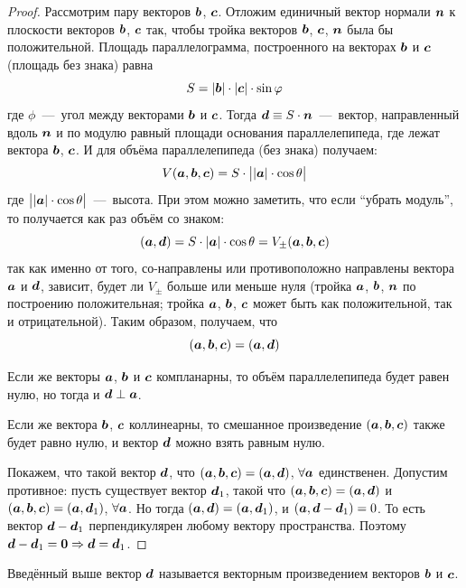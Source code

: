 \documentclass[a4paper,12pt]{article}
\begin{document}
\begin{proof}
    Рассмотрим пару векторов $\boldsymbol b$, $\boldsymbol c$.
    Отложим единичный вектор нормали $\boldsymbol n$ к плоскости векторов $\boldsymbol b$, $\boldsymbol c$ так, чтобы тройка векторов $\boldsymbol b$, $\boldsymbol c$, $\boldsymbol n$ была бы положительной.
    Площадь параллелограмма, построенного на векторах $\boldsymbol b$ и $\boldsymbol c$ (площадь без знака) равна
    \[
      S = |\boldsymbol b| \cdot |\boldsymbol c| \cdot \sin\varphi
    \]
    где $\phi$~---~угол между векторами $\boldsymbol b$ и $\boldsymbol c$.
    Тогда $\bds d \hm\equiv S \hm\cdot \bds n$~---~вектор, направленный вдоль $\boldsymbol n$ и по модулю равный площади основания параллелепипеда, где лежат вектора $\boldsymbol b$, $\boldsymbol c$.
    И для объёма параллелепипеда (без знака) получаем:
    \[
      V(\boldsymbol a, \boldsymbol b, \boldsymbol c) = S \cdot \bigl||\boldsymbol a| \cdot \cos\theta\bigr|
    \]
    где $\bigl||\boldsymbol a| \cdot \cos\theta\bigr|$~---~высота.
    При этом можно заметить, что если ``убрать модуль'', то получается как раз объём со знаком:
    \[
      (\boldsymbol a, \boldsymbol d) = S \cdot |\boldsymbol a| \cdot \cos\theta = V_{\pm}(\boldsymbol a, \boldsymbol b, \boldsymbol c)
    \]
    так как именно от того, со-направлены или противоположно направлены вектора $\boldsymbol a$ и $\boldsymbol d$, зависит, будет ли $V_{\pm}$ больше или меньше нуля (тройка $\boldsymbol a$, $\boldsymbol b$, $\boldsymbol n$ по построению положительная; тройка $\boldsymbol a$, $\boldsymbol b$, $\boldsymbol c$ может быть как положительной, так и отрицательной).
    Таким образом, получаем, что
    \[
      (\boldsymbol a, \boldsymbol b, \boldsymbol c) = (\boldsymbol a, \boldsymbol d)
    \]
    
    Если же векторы $\boldsymbol a$, $\boldsymbol b$ и $\boldsymbol c$ компланарны, то объём параллелепипеда будет равен нулю, но тогда и $\bds d \hm\perp \bds a$.
    
    Если же вектора $\boldsymbol b$, $\boldsymbol c$ коллинеарны, то смешанное произведение $(\boldsymbol a, \boldsymbol b, \boldsymbol c)$ также будет равно нулю, и вектор $\boldsymbol d$ можно взять равным нулю.
    
    Покажем, что такой вектор $\boldsymbol d$, что $(\bds a, \bds b, \bds c) \hm= (\bds a, \bds d)$, $\forall \boldsymbol a$ единственен.
    Допустим противное: пусть существует вектор $\boldsymbol d_1$, такой что $(\bds a, \bds b, \bds c) \hm= (\bds a, \bds d)$ и $(\bds a, \bds b, \bds c) \hm= (\bds a, \bds d_1)$, $\forall \boldsymbol a$.
    Но тогда $(\bds a, \bds d) \hm= (\bds a, \bds d_1)$, и $(\bds a, \bds d \hm- \bds d_1) \hm= 0$.
    То есть вектор $\bds d \hm- \bds d_1$ перпендикулярен любому вектору пространства.
    Поэтому $\bds d \hm- \bds d_1 \hm= \bds 0 \hm\Rightarrow \bds d \hm= \bds d_1$.
  \end{proof}
  
  Введённый выше вектор $\boldsymbol d$ называется векторным произведением векторов $\boldsymbol b$ и $\boldsymbol c$.
  
\end{document}
